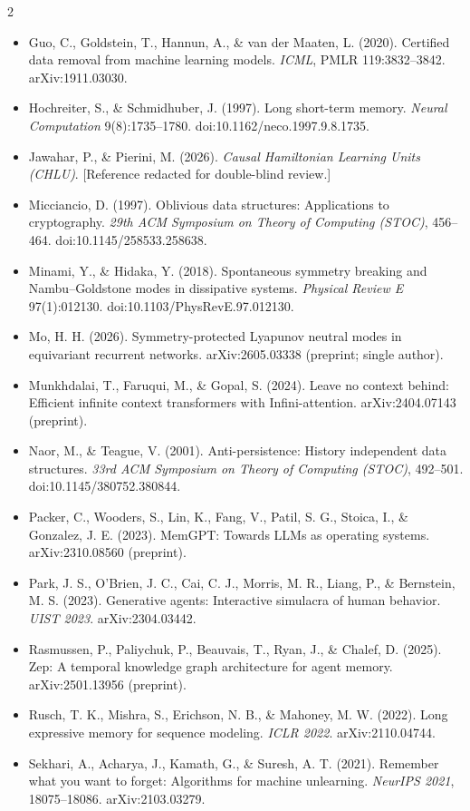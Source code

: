 \documentclass{article}
\begin{document}
{\begin{multicols}{2}
\begin{itemize}
\item Guo, C., Goldstein, T., Hannun, A., \& van der Maaten, L. (2020). Certified data removal from machine learning models. \emph{ICML}, PMLR 119:3832--3842. arXiv:1911.03030.
\item Hochreiter, S., \& Schmidhuber, J. (1997). Long short-term memory. \emph{Neural Computation} 9(8):1735--1780. doi:10.1162/neco.1997.9.8.1735.
\item Jawahar, P., \& Pierini, M. (2026). \emph{Causal Hamiltonian Learning Units (CHLU)}. [Reference redacted for double-blind review.]
\item Micciancio, D. (1997). Oblivious data structures: Applications to cryptography. \emph{29th ACM Symposium on Theory of Computing (STOC)}, 456--464. doi:10.1145/258533.258638.
\item Minami, Y., \& Hidaka, Y. (2018). Spontaneous symmetry breaking and Nambu--Goldstone modes in dissipative systems. \emph{Physical Review E} 97(1):012130. doi:10.1103/PhysRevE.97.012130.
\item Mo, H. H. (2026). Symmetry-protected Lyapunov neutral modes in equivariant recurrent networks. arXiv:2605.03338 (preprint; single author).
\item Munkhdalai, T., Faruqui, M., \& Gopal, S. (2024). Leave no context behind: Efficient infinite context transformers with Infini-attention. arXiv:2404.07143 (preprint).
\item Naor, M., \& Teague, V. (2001). Anti-persistence: History independent data structures. \emph{33rd ACM Symposium on Theory of Computing (STOC)}, 492--501. doi:10.1145/380752.380844.
\item Packer, C., Wooders, S., Lin, K., Fang, V., Patil, S. G., Stoica, I., \& Gonzalez, J. E. (2023). MemGPT: Towards LLMs as operating systems. arXiv:2310.08560 (preprint).
\item Park, J. S., O'Brien, J. C., Cai, C. J., Morris, M. R., Liang, P., \& Bernstein, M. S. (2023). Generative agents: Interactive simulacra of human behavior. \emph{UIST 2023}. arXiv:2304.03442.
\item Rasmussen, P., Paliychuk, P., Beauvais, T., Ryan, J., \& Chalef, D. (2025). Zep: A temporal knowledge graph architecture for agent memory. arXiv:2501.13956 (preprint).
\item Rusch, T. K., Mishra, S., Erichson, N. B., \& Mahoney, M. W. (2022). Long expressive memory for sequence modeling. \emph{ICLR 2022}. arXiv:2110.04744.
\item Sekhari, A., Acharya, J., Kamath, G., \& Suresh, A. T. (2021). Remember what you want to forget: Algorithms for machine unlearning. \emph{NeurIPS 2021}, 18075--18086. arXiv:2103.03279.

\end{itemize}
\end{multicols}}
\end{document}
